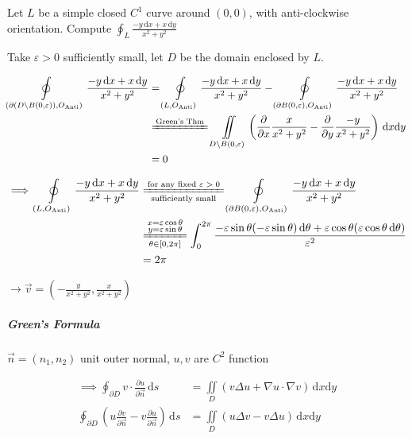 \begin{example}
    Let $L$ be a simple closed $C^1$ curve around $(0,0)$, with anti-clockwise orientation. Compute $\oint_L\frac{-y\,\mathrm{d}x+x\,\mathrm{d}y}{x^2+y^2}$

    Take $\varepsilon>0$ sufficiently small, let $D$ be the domain enclosed by $L$.

    \begin{align*}
        \oint\limits_{\left(\partial\left(D\setminus B(0,\varepsilon)\right),O_{\text{Anti}}\right)}\frac{-y\,\mathrm{d}x+x\,\mathrm{d}y}{x^2+y^2}
         & =\oint\limits_{\left(L,O_{\text{Anti}}\right)}\frac{-y\,\mathrm{d}x+x\,\mathrm{d}y}{x^2+y^2}-\oint\limits_{\left(\partial B(0,\varepsilon),O_{\text{Anti}}\right)}\frac{-y\,\mathrm{d}x+x\,\mathrm{d}y}{x^2+y^2} \\
         & \xlongequal{\text{Green's Thm}}\iint\limits_{D\setminus B(0,\varepsilon)}\left(\frac{\partial}{\partial x}\frac{x}{x^2+y^2}-\frac{\partial}{\partial y}\frac{-y}{x^2+y^2}\right)\,\mathrm{d}x\mathrm{d}y         \\
         & =0
    \end{align*}

    \begin{align*}
        \implies\oint\limits_{\left(L,O_{\text{Anti}}\right)}\frac{-y\,\mathrm{d}x+x\,\mathrm{d}y}{x^2+y^2}
         & \xlongequal[\text{sufficiently small}]{\text{for any fixed $\varepsilon>0$}}\oint\limits_{\left(\partial B(0,\varepsilon),O_{\text{Anti}}\right)}\frac{-y\,\mathrm{d}x+x\,\mathrm{d}y}{x^2+y^2} \\
         & \xlongequal[{\theta\in\left[0,2\pi\right]}]{\substack{x=\varepsilon\cos\theta                                                                                                                   \\y=\varepsilon\sin\theta}}\int_0^{2\pi}\frac{-\varepsilon\sin\theta(-\varepsilon\sin\theta)\,\mathrm{d}\theta+\varepsilon\cos\theta(\varepsilon\cos\theta\,\mathrm{d}\theta)}{\varepsilon^2}\\
         & =2\pi
    \end{align*}

    $\rightarrow\overrightarrow{v}=\left(-\frac{y}{x^2+y^2},\frac{x}{x^2+y^2}\right)$
\end{example}

\subparagraph*{Green's Formula}

$\overrightarrow{n}=(n_1,n_2)$ unit outer normal, $u,v$ are $C^2$ function

\begin{align*}
    \implies\oint_{\partial D}v\cdot\frac{\partial u}{\partial\overrightarrow{n}}\,\mathrm{d}s
     & =\iint\limits_D\left(v\Delta u+\nabla u\cdot\nabla v\right)\,\mathrm{d}x\mathrm{d}y \\
    \oint_{\partial D}\left(u\frac{\partial v}{\partial\overrightarrow{n}}-v\frac{\partial u}{\partial\overrightarrow{n}}\right)\,\mathrm{d}s
     & =\iint\limits_D\left(u\Delta v-v\Delta u\right)\,\mathrm{d}x\mathrm{d}y
\end{align*}

